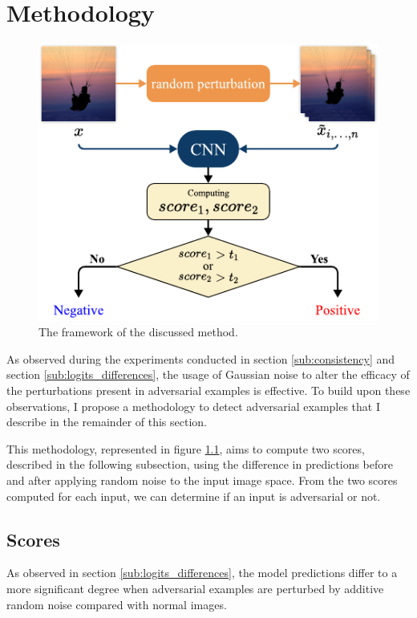 \chapter{Methodology}
\label{Methodology}
\overridetextsize

\begin{figure}[htp]
    \includegraphics[clip,width=\columnwidth]{Figures/methodology/Framework.pdf}%

    \caption{The framework of the discussed method.}
    \label{fig:framework}
\end{figure}


As observed during the experiments conducted in section \ref{sub:consistency}
and section \ref{sub:logits_differences}, the usage of Gaussian noise to alter
the efficacy of the perturbations present in adversarial examples is effective.
To build upon these observations, I propose a methodology to detect adversarial
examples that I describe in the remainder of this section.

This methodology, represented in figure \ref{fig:framework}, aims to compute two
scores, described in the following subsection, using the difference in
predictions before and after applying random noise to the input image space.
From the two scores computed for each input, we can determine if an input is
adversarial or not.


\section{Scores}
\label{sub:detection_metrics}
As observed in section \ref{sub:logits_differences}, the model predictions
differ to a more significant degree when adversarial examples are perturbed by
additive random noise compared with normal images.

